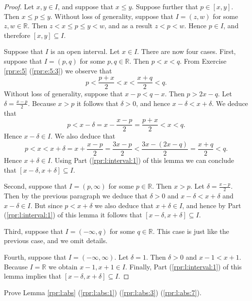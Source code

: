 \begin{proof}
	\hfill

	Let $x, y \in I$, and suppose that $x \leq y$. Suppose further that $p \in [x, y]$. Then $x \leq p \leq y$. Without loss of generality, suppose that $I = (z, w)$ for some $z, w \in \mathbb{R}$. Then $z < x \leq p \leq y < w$, and as a result $z < p < w$. Hence $p \in I$, and therefore $[x, y] \subseteq I$.

	Suppose that $I$ is an open interval. Let $x \in I$. There are now four cases. First, suppose that $I = (p, q)$ for some $p, q \in \mathbb{R}$. Then $p < x < q$. From Exercise \ref{rpr:e:5} (\ref{rpr:e:5:3}) we observe that
	$$
		p < \frac{p + x}{2} < x < \frac{x + q}{2} < q.
	$$
	Without loss of generality, suppose that $x - p < q - x$. Then $p > 2x - q$. Let $\delta = \frac{x - p}{2}$. Because $x > p$ it follows that $\delta > 0$, and hence $x - \delta < x + \delta$. We deduce that
	$$
		p < x - \delta = x - \frac{x - p}{2} = \frac{p + x}{2} < x < q.
	$$
	Hence $x - \delta \in I$. We also deduce that
	$$
		p < x < x + \delta = x + \frac{x - p}{2} = \frac{3x - p}{2} < \frac{3x - (2x - q)}{2} = \frac{x + q}{2} < q.
	$$
	Hence $x + \delta \in I$. Using Part (\ref{rpr:l:interval:1}) of this lemma we can conclude that $[x - \delta, x + \delta] \subseteq I$.

	Second, suppose that $I = (p, \infty)$ for some $p \in \mathbb{R}$. Then $x > p$. Let $\delta = \frac{x - p}{2}$. Then by the previous paragraph we deduce that $\delta > 0$ and $x - \delta < x + \delta$ and $x - \delta \in I$. But since $p < x + \delta$ we also deduce that $x + \delta \in I$, and hence by Part (\ref{rpr:l:interval:1}) of this lemma it follows that $[x - \delta, x + \delta] \subseteq I$.

	Third, suppose that $I = (-\infty, q)$ for some $q \in \mathbb{R}$. This case is just like the previous case, and we omit details.

	Fourth, suppose that $I = (-\infty, \infty)$. Let $\delta = 1$. Then $\delta > 0$ and $x - 1 < x + 1$. Because $I = \mathbb{R}$ we obtain $x - 1, x + 1 \in I$. Finally, Part (\ref{rpr:l:interval:1}) of this lemma implies that $[x - \delta, x + \delta] \subseteq I$.
\end{proof}


\Newpage
\begin{exercise} %
	Prove Lemma \ref{rpr:l:abs} (\ref{rpr:l:abs:1}) (\ref{rpr:l:abs:3}) (\ref{rpr:l:abs:7}).
\end{exercise}

